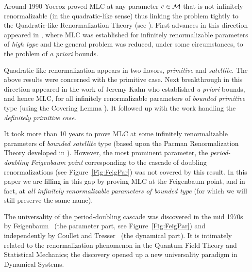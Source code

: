 \documentclass{amsart}
\newcommand{\1}{{\mathbb 1 }}
\begin{document}
Around 1990 Yoccoz proved MLC at any parameter $c\in {\mathcal{M}}$ that is
not infinitely renormalizable (in the quadratic-like sense)
thus linking  the problem tightly to the Quadratic-like
Renormalization Theory
(see \cite{H,M}).
First advances in this direction appeared in \cite{puzzle}, where MLC
was established for infinitely renormalizable parameters of  {\em high type}
and the general problem was reduced, under some circumstances,  to the problem of
{\em a priori} bounds.



Quadratic-like renormalization appears in two flavors, {\em primitive}
and {\em satellite}. The above results were concerned with the
primitive case. Next breakthrough in this direction appeared in the
work of Jeremy Kahn \cite{K} who established {\em a priori} bounds,
and hence MLC, for all infinitely renormalizable parameters of  {\em bounded
primitive} type (using the Covering Lemma \cite{covering lemma}).
It followed up with the work \cite{decorations,molecules}
handling the {\em definitely primitive case}. 

It took more than  10 years to prove MLC at  some infinitely renormalizable parameters of
{\em bounded satellite} type \cite {DL} (based upon the Pacman
Renormalization Theory developed in \cite{DLS}).  However, the most
prominent parameter, the {\em period-doubling Feigenbaum point} corresponding to the
cascade of doubling renormalizations (see Figure~\ref{Fig:FeigPar}) was not covered by this result.
In this paper we are filling in this gap by proving MLC at the Feigenbaum
point, and in fact, at {\em all infinitely renormalizable parameters of bounded type} (for which we will still preserve the same name). 

\begin{rem} The universality of the period-doubling cascade was discovered in the mid 1970s by Feigenbaum~\cite{F1,F2} (the parameter part, see Figure~\ref{Fig:FeigPar}) and independently by Coullet and Tresser~\cite{TC,CT} (the dynamical part). It is intimately related to the renormalization phenomenon in the Quantum Field Theory and Statistical Mechanics; the discovery opened up a new universality paradigm in Dynamical Systems.
\end{rem}
\end{document}
